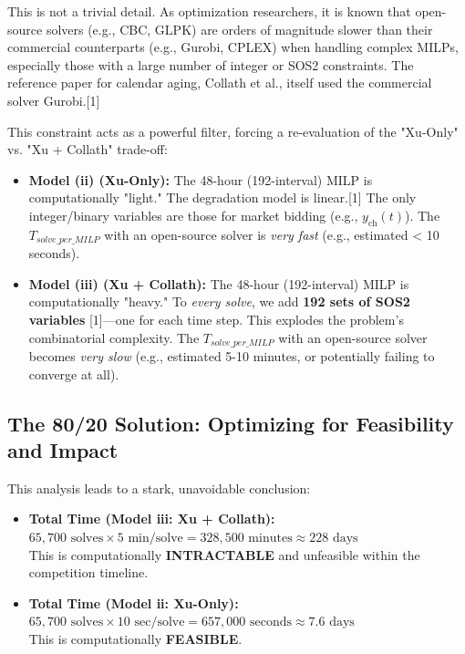 \documentclass[11pt, a4paper]{article}
\begin{document}
This is not a trivial detail. As optimization researchers, it is known that open-source solvers (e.g., CBC, GLPK) are orders of magnitude slower than their commercial counterparts (e.g., Gurobi, CPLEX) when handling complex MILPs, especially those with a large number of integer or SOS2 constraints. The reference paper for calendar aging, Collath et al., itself used the commercial solver Gurobi.[1]

This constraint acts as a powerful filter, forcing a re-evaluation of the "Xu-Only" vs. "Xu + Collath" trade-off:

\begin{itemize}
    \item \textbf{Model (ii) (Xu-Only):} The 48-hour (192-interval) MILP is computationally "light." The degradation model is linear.[1] The only integer/binary variables are those for market bidding (e.g., $y_{\mathrm{ch}}(t)$). The $T_{solve\_per\_MILP}$ with an open-source solver is \textit{very fast} (e.g., estimated < 10 seconds).
    \item \textbf{Model (iii) (Xu + Collath):} The 48-hour (192-interval) MILP is computationally "heavy." To \textit{every solve}, we add \textbf{192 sets of SOS2 variables} [1]—one for each time step. This explodes the problem's combinatorial complexity. The $T_{solve\_per\_MILP}$ with an open-source solver becomes \textit{very slow} (e.g., estimated 5-10 minutes, or potentially failing to converge at all).
\end{itemize}

\subsection{The 80/20 Solution: Optimizing for Feasibility and Impact}

This analysis leads to a stark, unavoidable conclusion:

\begin{itemize}
    \item \textbf{Total Time (Model iii: Xu + Collath):} \\
    $65,700 \text{ solves} \times \text{5 min/solve} = 328,500 \text{ minutes} \approx \text{228 days}$ \\
    This is computationally \textbf{INTRACTABLE} and unfeasible within the competition timeline.

    \item \textbf{Total Time (Model ii: Xu-Only):} \\
    $65,700 \text{ solves} \times \text{10 sec/solve} = 657,000 \text{ seconds} \approx \text{7.6 days}$ \\
    This is computationally \textbf{FEASIBLE}.
\end{itemize}
\end{document}

